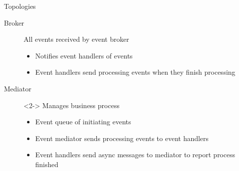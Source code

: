 \documentclass{slide}
\begin{document}
\begin{frame}{Topologies}
    \vspace{1mm}
    {\LARGE
    \begin{description}
        \item[Broker] All events received by event broker
        \begin{itemize}
            \Large\item Notifies event handlers of events
            \Large\item Event handlers send processing events when they finish processing
        \end{itemize}
        \vspace{3mm}
        \item[Mediator]<2-> Manages business process
        \begin{itemize}
            \Large\item Event queue of initiating events
            \Large\item Event mediator sends processing events to event handlers
            \Large\item Event handlers send async messages to mediator to report process finished
	\end{itemize}
    \end{description}
    }
\end{frame}
\end{document}

